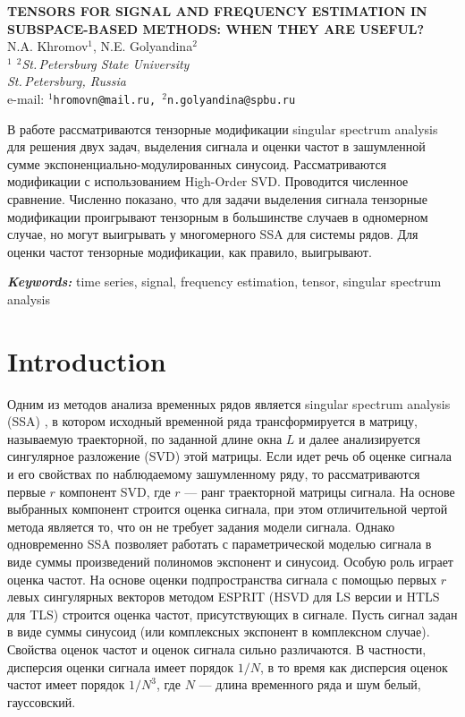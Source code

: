 \documentclass[12pt]{article}
\providecommand{\keywords}[1]
{
  \vspace{2mm}\hspace{20pt}\textbf{\textit{Keywords:}} #1
}
\providecommand{\abskeyw}[2]
{
  \begin{small}
    \begin{adjustwidth}{10mm}{10mm}
      \vspace{1mm}\hspace{20pt}#1

      \keywords{#2}
    \end{adjustwidth}
  \end{small}
}
\theoremstyle{definition}
\theoremstyle{remark}
\begin{document}
\begin{center}
  {\Large\bf TENSORS FOR SIGNAL AND FREQUENCY ESTIMATION IN
  SUBSPACE-BASED METHODS: WHEN THEY ARE USEFUL?}\\\vspace{2mm} {\sc N.A.
  Khromov$^1$, N.E. Golyandina$^2$}\\\vspace{2mm}
{\it $^{1}$ $^{2}$St.\,Petersburg State University\\
St.\,Petersburg, Russia\\} e-mail: {\tt $^1$hromovn@mail.ru,
$^2$n.golyandina@spbu.ru}

  \abskeyw{В работе рассматриваются тензорные модификации singular spectrum analysis для решения двух задач, выделения сигнала и оценки частот в зашумленной сумме экспоненциально-модулированных синусоид.  Рассматриваются модификации с использованием High-Order SVD. Проводится численное сравнение. Численно показано, что для задачи выделения сигнала тензорные модификации проигрывают тензорным в большинстве случаев в одномерном случае, но могут выигрывать у многомерного SSA для системы рядов. Для оценки частот тензорные модификации, как правило, выигрывают.}{time series, signal, frequency estimation, tensor, singular spectrum analysis}
\end{center}

\section{Introduction}

Одним из методов анализа временных рядов является singular spectrum analysis (SSA) \cite{...}, в котором исходный временной ряда трансформируется в матрицу, называемую траекторной, по заданной длине окна $L$ и далее анализируется сингулярное разложение (SVD) этой матрицы. Если идет речь об оценке сигнала и его свойствах по наблюдаемому зашумленному ряду, то рассматриваются первые $r$ компонент SVD, где $r$ --- ранг траекторной матрицы сигнала. На основе выбранных компонент строится оценка сигнала, при этом отличительной чертой метода является то, что он не требует задания модели сигнала. Однако одновременно SSA позволяет работать с параметрической моделью сигнала в виде суммы произведений полиномов экспонент и синусоид. Особую роль играет оценка частот. На основе оценки подпространства сигнала с  помощью первых $r$ левых сингулярных векторов методом ESPRIT (HSVD для LS версии и HTLS для TLS) \cite{...} строится оценка частот, присутствующих в сигнале. Пусть сигнал задан в виде суммы синусоид (или комплексных экспонент в комплексном случае). Свойства оценок частот и оценок сигнала сильно различаются. В частности, дисперсия  оценки сигнала имеет порядок $1/N$, в то время как дисперсия оценок частот имеет порядок $1/N^3$, где $N$ --- длина временного ряда и шум белый, гауссовский.
\end{document}
